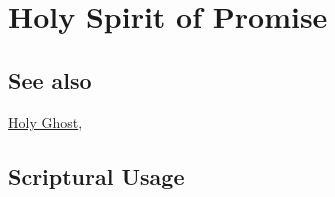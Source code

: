 \section{Holy Spirit of Promise}
	\label{HSOP}
	
\subsection{See also}

	\hyperref[HOLYGHOST]{Holy Ghost},




	


\subsection{Scriptural Usage} %
	\label{HSOP-SCRIPTURES}

